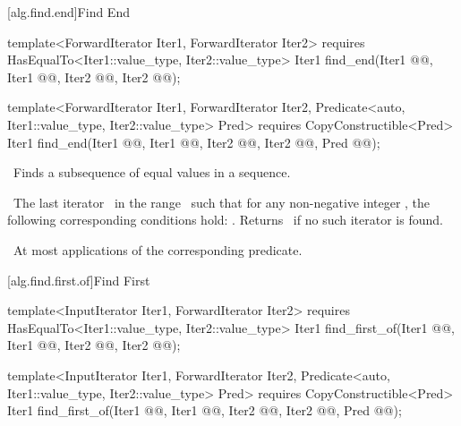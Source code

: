 \documentclass[american,twoside]{book}
\begin{document}
\begin{paras}
[alg.find.end]{Find End}

%
\color{addclr}\begin{itemdecl}
template<ForwardIterator Iter1, ForwardIterator Iter2>
  requires HasEqualTo<Iter1::value_type, Iter2::value_type>
  Iter1 find_end(Iter1 @@, Iter1 @@,
                 Iter2 @@, Iter2 @@);

template<ForwardIterator Iter1, ForwardIterator Iter2, 
         Predicate<auto, Iter1::value_type, Iter2::value_type> Pred>
  requires CopyConstructible<Pred>
  Iter1 find_end(Iter1 @@, Iter1 @@,
                 Iter2 @@, Iter2 @@,
                 Pred @@);
\end{itemdecl}\color{black}

\begin{itemdescr}
\pnum
\effects\ 
Finds a subsequence of equal values in a sequence.

\pnum
\textcolor{black}{}\returns\ 
The last iterator
\
in the range \
such that for any non-negative integer
,
the following corresponding conditions hold:
.
Returns \farg{last1}\
if no such iterator is found.

\pnum
\complexity\ 
At most
applications of the corresponding predicate.
\end{itemdescr}

\rSec2[alg.find.first.of]{Find First}


%
\color{addclr}\begin{itemdecl}
template<InputIterator Iter1, ForwardIterator Iter2>
  requires HasEqualTo<Iter1::value_type, Iter2::value_type>
  Iter1 find_first_of(Iter1 @@, Iter1 @@,
                      Iter2 @@, Iter2 @@);

template<InputIterator Iter1, ForwardIterator Iter2,
         Predicate<auto, Iter1::value_type, Iter2::value_type> Pred>
  requires CopyConstructible<Pred>
  Iter1 find_first_of(Iter1 @\farg{first1}@, Iter1 @\farg{last1}@,
                      Iter2 @\farg{first2}@, Iter2 @\farg{last2}@,
                      Pred @@);
\end{itemdecl}\color{black}


\end{paras}
\end{document}
